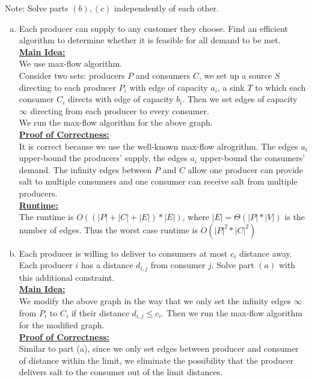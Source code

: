 \documentclass{article}\usepackage[utf8]{inputenc}\usepackage[margin=0.4cm,top=0.4cm,bottom=0.4cm]{geometry}\usepackage[usenames,dvipsnames,svgnames,table]{xcolor}
\begin{document}
\noindent Note: Solve parts $(b), (c)$ independently of each other.
\begin{enumerate}[(a)]
\item Each producer can supply to any customer they choose. Find an efficient algorithm to determine whether it is feasible for all demand to be met.
\BeginSolution %
\\
\underline{\textbf{Main Idea:}} \\
We use max-flow algorithm.\\
Consider two sets: producers $P$ and consumers $C$, we set up a source $S$ directing to each producer $P_i$ with edge of capacity $a_i$, a sink $T$ to which each consumer $C_i$ directs with edge of capacity $b_i$. Then we set edges of capacity $\infty$ directing from each producer to every consumer.\\
We run the max-flow algorithm for the above graph.\\
\underline{\textbf{Proof of Correctness:}} \\
It is correct because we use the well-known max-flow alrogrithm. The edges $a_i$ upper-bound the producers' supply, the edges $a_i$ upper-bound the consumers' demand. The infinity edges between $P$ and $C$ allow one producer can provide salt to multiple consumers and one consumer can receive salt from multiple producers.\\
\underline{\textbf{Runtime:}}\\
The runtime is $O\left((|P| + |C| + |E|)*|E|\right)$, where $|E|=\Theta\left(|P|*|V|\right)$ is the number of edges. Thus the worst case runtime is $O\left(|P|^2*|C|^2\right)$
\EndSolution
\item Each producer is willing to deliver to consumers at most $c_i$ distance away. Each producer $i$ has a distance $d_{i,j}$ from consumer $j$. Solve part $(a)$ with this additional constraint.
\BeginSolution %
\\
\underline{\textbf{Main Idea:}} \\
We modify the above graph in the way that we only set the infinity edges $\infty$ from $P_i$ to $C_i$ if their distance $d_{i,j} \leq c_i$. Then we run the max-flow algorithm for the modified graph.\\
\underline{\textbf{Proof of Correctness:}} \\
Similar to part (a), since we only set edges between producer and consumer of distance within the limit, we eliminate the possibility that the producer delivers salt to the consumer out of the limit distances.\\

\end{enumerate}
\end{document}
